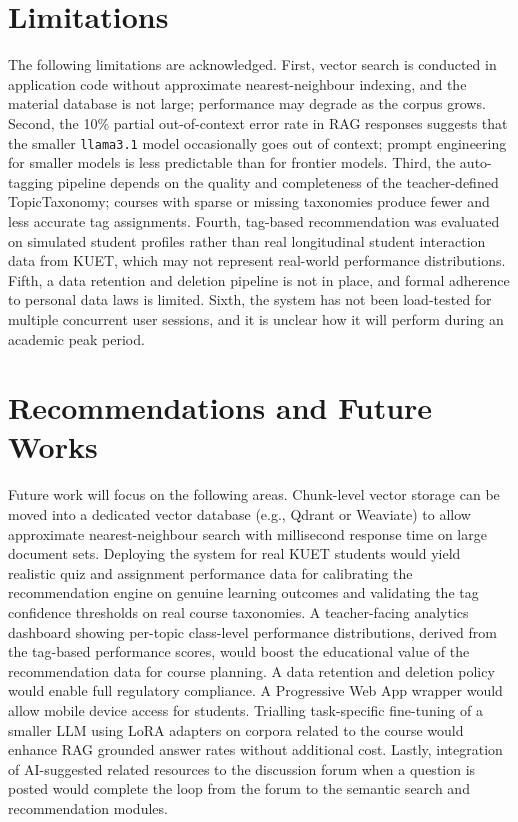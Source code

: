 \documentclass[12pt,a4paper]{report}
\begin{document}
\section{Limitations}

The following limitations are acknowledged. First, vector search is conducted in application code without approximate nearest-neighbour indexing, and the material database is not large; performance may degrade as the corpus grows. Second, the 10\% partial out-of-context error rate in RAG responses suggests that the smaller \texttt{llama3.1} model occasionally goes out of context; prompt engineering for smaller models is less predictable than for frontier models. Third, the auto-tagging pipeline depends on the quality and completeness of the teacher-defined TopicTaxonomy; courses with sparse or missing taxonomies produce fewer and less accurate tag assignments. Fourth, tag-based recommendation was evaluated on simulated student profiles rather than real longitudinal student interaction data from KUET, which may not represent real-world performance distributions. Fifth, a data retention and deletion pipeline is not in place, and formal adherence to personal data laws is limited. Sixth, the system has not been load-tested for multiple concurrent user sessions, and it is unclear how it will perform during an academic peak period.

\section{Recommendations and Future Works}

Future work will focus on the following areas. Chunk-level vector storage can be moved into a dedicated vector database (e.g., Qdrant or Weaviate) to allow approximate nearest-neighbour search with millisecond response time on large document sets. Deploying the system for real KUET students would yield realistic quiz and assignment performance data for calibrating the recommendation engine on genuine learning outcomes and validating the tag confidence thresholds on real course taxonomies. A teacher-facing analytics dashboard showing per-topic class-level performance distributions, derived from the tag-based performance scores, would boost the educational value of the recommendation data for course planning. A data retention and deletion policy would enable full regulatory compliance. A Progressive Web App wrapper would allow mobile device access for students. Trialling task-specific fine-tuning of a smaller LLM using LoRA adapters on corpora related to the course would enhance RAG grounded answer rates without additional cost. Lastly, integration of AI-suggested related resources to the discussion forum when a question is posted would complete the loop from the forum to the semantic search and recommendation modules.
\end{document}
